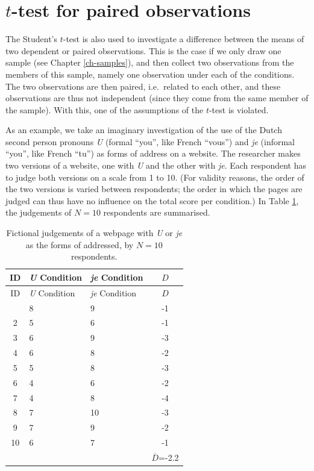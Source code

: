 \documentclass[
]{book}
\begin{document}
\hypertarget{sec:ttest-paired}{%
\section{\texorpdfstring{\(t\)-test for paired observations}{t-test for paired observations}}\label{sec:ttest-paired}}

The Student's \(t\)-test is also used to investigate a difference between the
means of two dependent or paired observations. This is the case if we only draw
one sample (see Chapter \ref{ch-samples}), and then collect two observations
from the members of this sample,
namely one observation under each of the conditions. The two
observations are then paired, i.e.~related to each other,
and these observations are thus not independent (since they come
from the same member of the sample). With this, one of the assumptions of
the \(t\)-test is violated.

As an example, we take an imaginary investigation of the use of the
Dutch second person pronouns \emph{U} (formal ``you'', like French ``vous'') and \emph{je} (informal ``you'', like French ``tu'') as forms of address on a website. The researcher makes two versions
of a website, one with \emph{U} and the other with \emph{je}. Each
respondent has to judge both versions on a scale from 1 to 10. (For validity
reasons, the order of the two versions is varied between respondents;
the order in which the pages are judged can thus
have no influence on the total score per condition.) In Table
\ref{tab:data-uje-paired}, the judgements of \(N=10\)
respondents are summarised.

\begin{longtable}[]{@{}cllc@{}}
\caption{\label{tab:data-uje-paired} Fictional judgements of a webpage
with \emph{U} or \emph{je} as the forms of addressed, by \(N=10\) respondents.}\tabularnewline
\toprule\noalign{}
ID & \emph{U} Condition & \emph{je} Condition & \(D\) \\
\midrule\noalign{}
\endfirsthead
\toprule\noalign{}
ID & \emph{U} Condition & \emph{je} Condition & \(D\) \\
\midrule\noalign{}
\endhead
\bottomrule\noalign{}
\endlastfoot
1 & 8 & 9 & -1 \\
2 & 5 & 6 & -1 \\
3 & 6 & 9 & -3 \\
4 & 6 & 8 & -2 \\
5 & 5 & 8 & -3 \\
6 & 4 & 6 & -2 \\
7 & 4 & 8 & -4 \\
8 & 7 & 10 & -3 \\
9 & 7 & 9 & -2 \\
10 & 6 & 7 & -1 \\
& & & \(\overline{D}\)=-2.2 \\
\end{longtable}
\end{document}
